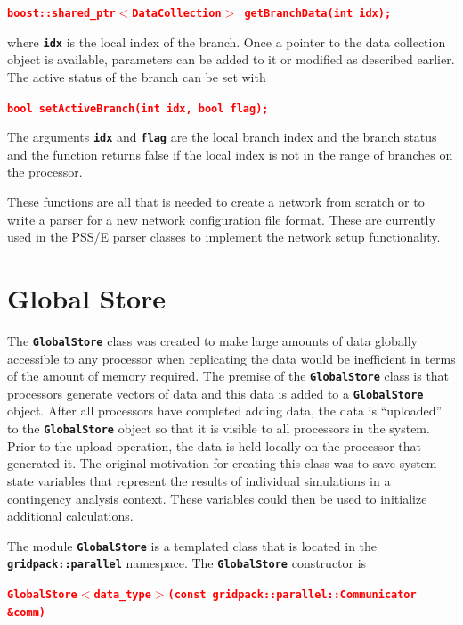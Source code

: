 \documentclass[12pt]{report} %
\begin{document}
\textcolor{red}{\texttt{\textbf{boost::shared\_ptr$\boldsymbol{\mathrm{<}}$DataCollection$\boldsymbol{\mathrm{>}}$ getBranchData(int idx);}}}

where \texttt{\textbf{idx}} is the local index of the branch. Once a pointer to the data collection object is available, parameters can be added to it or modified as described earlier. The active status of the branch can be set with

\textcolor{red}{\texttt{\textbf{bool setActiveBranch(int idx, bool flag);}}}

The arguments \texttt{\textbf{idx}} and \texttt{\textbf{flag}} are the local branch index and the branch status and the function returns false if the local index is not in the range of branches on the processor.

These functions are all that is needed to create a network from scratch or to write a parser for a new network configuration file format. These are currently used in the PSS/E parser classes to implement the network setup functionality.

\section{Global Store}

The \texttt{\textbf{GlobalStore}} class was created to make large amounts of data globally accessible to any processor when replicating the data would be inefficient in terms of the amount of memory required. The premise of the \texttt{\textbf{GlobalStore}} class is that processors generate vectors of data and this data is added to a \texttt{\textbf{GlobalStore}} object. After all processors have completed adding data, the data is ``uploaded'' to the \texttt{\textbf{GlobalStore}} object so that it is visible to all processors in the system. Prior to the upload operation, the data is held locally on the processor that generated it. The original motivation for creating this class was to save system state variables that represent the results of individual simulations in a contingency analysis context. These variables could then be used to initialize additional calculations.

The module \texttt{\textbf{GlobalStore}} is a templated class that is located in the \texttt{\textbf{gridpack::parallel}} namespace. The \texttt{\textbf{GlobalStore}} constructor is

\textcolor{red}{\texttt{\textbf{GlobalStore$\boldsymbol{\mathrm{<}}$data\_type$\boldsymbol{\mathrm{>}}$(const gridpack::parallel::Communicator \&comm)}}}
\end{document}
